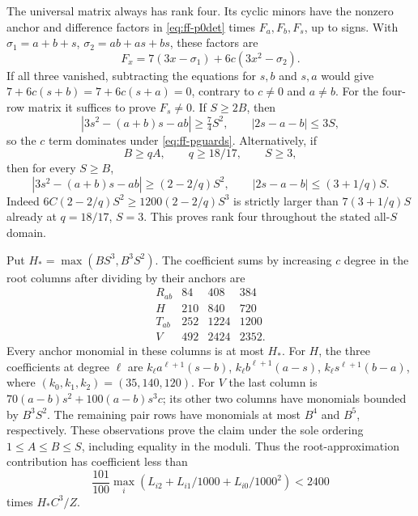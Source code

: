 \documentclass[12pt]{article}
\numberwithin{equation}{section}
\begin{document}
The universal matrix always has rank four. Its cyclic minors have
the nonzero anchor and difference factors in \eqref{eq:ff-p0det}
times $F_a,F_b,F_s$, up to signs. With
$\sigma_1=a+b+s$, $\sigma_2=ab+as+bs$, these factors are
\[
 F_x=7(3x-\sigma_1)+6c(3x^2-\sigma_2).
\]
If all three vanished, subtracting the equations for $s,b$ and $s,a$
would give $7+6c(s+b)=7+6c(s+a)=0$, contrary to $c\ne0$ and $a\ne b$.
For the four-row matrix it suffices to prove $F_s\ne0$.
If $S\ge2B$, then
\[
 |3s^2-(a+b)s-ab|\ge\tfrac74S^2,\qquad |2s-a-b|\le3S,
\]
so the $c$ term dominates under \eqref{eq:ff-pguards}.
Alternatively, if
\begin{equation}\label{eq:ff-allSrank}
 B\ge qA,\qquad q\ge18/17,\qquad S\ge3,
\end{equation}
then for every $S\ge B$,
\[
 |3s^2-(a+b)s-ab|\ge(2-2/q)S^2,
 \qquad |2s-a-b|\le(3+1/q)S.
\]
Indeed $6C(2-2/q)S^2\ge1200(2-2/q)S^3$
is strictly larger than $7(3+1/q)S$ already at $q=18/17$, $S=3$.
This proves rank four throughout the stated all-$S$ domain.

Put $H_* =\max(BS^3,B^3S^2)$. The coefficient sums by increasing
$c$ degree in the root columns after dividing by their anchors are
\begin{equation}\label{eq:ff-pdegrees}
 \begin{array}{c|rrr}
  R_{ab}&84&408&384\\
  H&210&840&720\\
  T_{ab}&252&1224&1200\\
  V&492&2424&2352.
 \end{array}
\end{equation}
Every anchor monomial in these columns is at most $H_*$.
For $H$, the three coefficients at degree $\ell$ are
$k_\ell a^{\ell+1}(s-b)$,
$k_\ell b^{\ell+1}(a-s)$,
$k_\ell s^{\ell+1}(b-a)$, where $(k_0,k_1,k_2)=(35,140,120)$.
For $V$ the last column is $70(a-b)s^2+100(a-b)s^3c$;
its other two columns have monomials bounded by $B^3S^2$.
The remaining pair rows have monomials at most $B^4$ and $B^5$,
respectively. These observations prove the claim under the sole
ordering $1\le A\le B\le S$, including equality in the moduli.
Thus the root-approximation contribution has coefficient less than
\[
 \frac{101}{100}\max_i(L_{i2}+L_{i1}/1000+L_{i0}/1000^2)<2400
\]
times $H_*C^3/Z$.
\end{document}
